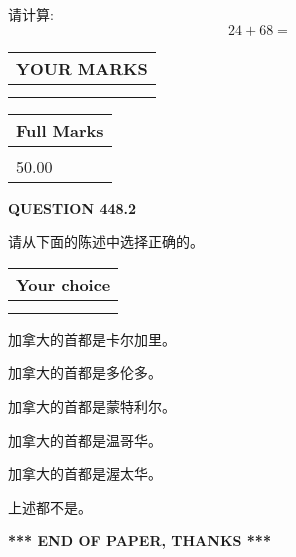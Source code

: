 \documentclass{ctexart}
\begin{document}
  
 
请计算:
\begin{equation}
24 +  %
68 = \nonumber
\end{equation}
 

 

 
  
\vspace{0.2in}
  
\noindent\begin{tabular}{|l|}
\hline
 YOUR MARKS  \\
\hline
 \\ 
 \\ 
\hline
\end{tabular}
\hspace{0.05in} \begin{tabular}{|l|}
\hline
 Full Marks  \\
\hline
 \\ 
50.00 \\
\hline
\end{tabular}
{\textbf{\Large{QUESTION
448.2 
}}}
  
  
请从下面的陈述中选择正确的。
  
  
\noindent\hspace{3.0in} \begin{tabular}{|l|}
\hline
Your choice \\
\hline
 \\ 
 \\ 
\hline
\end{tabular}
  
  
 
 
加拿大的首都是卡尔加里。
 
 
加拿大的首都是多伦多。
 
 
加拿大的首都是蒙特利尔。
 
 
加拿大的首都是温哥华。
 
 
加拿大的首都是渥太华。
 
 
 上述都不是。
 
 
   
   
 \vspace{0.2in}
 
   
   
   
   
\vspace{1.0in} 
{\textbf{\large{ *** END OF PAPER, THANKS *** }}} 
   
\end{document}
